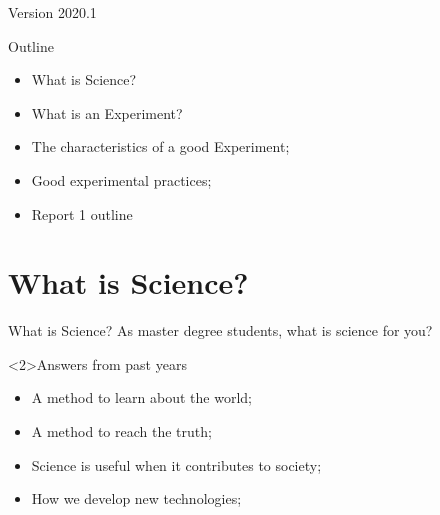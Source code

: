 \documentclass{beamer}
\subtitle[Experimentalism]{Topic 01 - What is an experiment?}
\begin{document}
\begin{CJK}{UTF8}{ipxm}

\begin{frame}
  \maketitle

  \vfill

  \hfill Version 2020.1
\end{frame}

\begin{frame}{Outline}
  \begin{itemize}
    \item What is Science?
    \item What is an Experiment?
    \item The characteristics of a good Experiment;
    \item Good experimental practices;
    \item Report 1 outline
  \end{itemize}
\end{frame}

\section{What is Science?}

\begin{frame}{What is Science?}
  As master degree students, what is science for you?
  \bigskip

  \begin{block}<2>{Answers from past years}
    \begin{itemize}
      \item A method to learn about the world;
      \item A method to reach the truth;
      \item Science is useful when it contributes to society;
      \item How we develop new technologies;
    \end{itemize}
  \end{block}
\end{frame}


\end{CJK}
\end{document}
